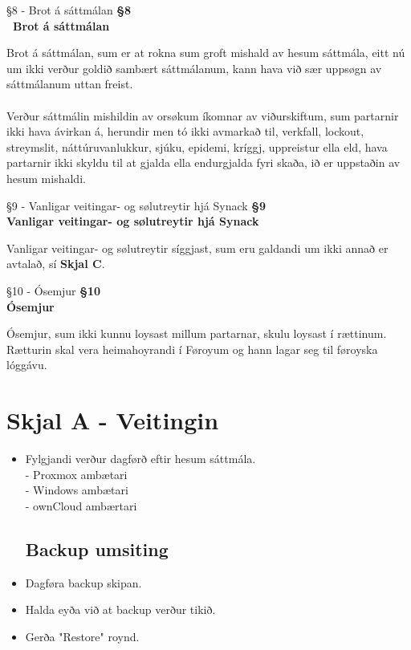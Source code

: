 \begin{center}
	 {§8 - Brot á sáttmálan}
	\textbf{ §8 \\ Brot á sáttmálan}
\end{center}
Brot á sáttmálan, sum er at rokna sum groft mishald av hesum sáttmála, eitt nú um ikki verður goldið sambært sáttmálanum, kann hava við sær uppsøgn av sáttmálanum uttan freist. \\ \\
Verður sáttmálin mishildin av orsøkum íkomnar av viðurskiftum, sum partarnir ikki hava ávirkan á, herundir men tó ikki avmarkað til, verkfall, lockout, streymslit, náttúruvanlukkur, sjúku, epidemi, kríggj, uppreistur ella eld, hava partarnir ikki skyldu til at gjalda ella endurgjalda fyri skaða, ið er uppstaðin av hesum mishaldi.

\begin{center}
	 {§9 - Vanligar veitingar- og sølutreytir hjá Synack}
	\textbf{§9 \\ Vanligar veitingar- og sølutreytir hjá Synack} \\
\end{center}
Vanligar veitingar- og sølutreytir síggjast, sum eru galdandi um ikki annað er avtalað, sí \textbf{Skjal C}.

\begin{center}
	 {§10 - Ósemjur}
	\textbf{§10 \\ Ósemjur}
\end{center}
Ósemjur, sum ikki kunnu loysast millum partarnar, skulu loysast í rættinum. Rætturin skal vera heimahoyrandi í Føroyum og hann lagar seg til føroyska lóggávu.

\newpage
\section{Skjal A - Veitingin}
\begin{itemize}

\subsection*{Servara umsiting}
	\item Fylgjandi verður dagførð eftir hesum sáttmála. \\
	- Proxmox ambætari							\\
	- Windows ambætari							\\
	- ownCloud ambærtari
	
\subsection*{Backup umsiting}
	\item Dagføra backup skipan.
	\item Halda eyða við at backup verður tikið.
	\item Gerða "Restore" roynd.
	
\end{itemize}


